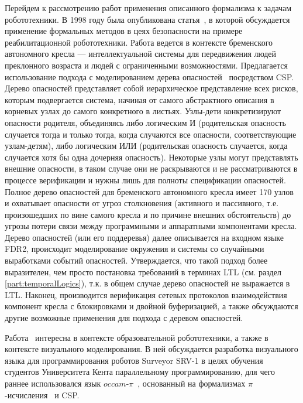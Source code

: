 \documentclass[conference]{IEEEtran}
\begin{document}
Перейдем к рассмотрению работ применения описанного формализма к задачам 
робототехники. В 1998 году была опубликована статья~\cite{lankenau1999formal}, 
в которой обсуждается применение формальных методов в цеях безопасности на 
примере реабилитационной робототехники. Работа ведется в контексте бременского 
автономного кресла --- интеллектуальной системы для передвижения людей преклонного 
возраста и людей с ограниченными возможностями. Предлагается использование 
подхода с моделированием дерева опасностей~\cite{vesely1981fault, hansen1996linking} 
посредством CSP. Дерево опасностей представляет собой иерархическое представление 
всех рисков, которым подвергается система, начиная от самого абстрактного описания 
в корневых узлах до самого конкретного в листьях. Узлы-дети конкретизируют опасности 
родителя, объединяясь либо логическим И (родительская опасность случается тогда 
и только тогда, когда случаются все опасности, соответствующие узлам-детям), 
либо логическим ИЛИ (родительская опасность случается, когда случается хотя бы 
одна дочерняя опасность). Некоторые узлы могут представлять внешние опасности, 
в таком случае они не раскрываются и не рассматриваются в процессе верификации 
и нужны лишь для полноты спецификации опасностей. Полное дерево опасностей для 
бременского автономного кресла имеет 170 узлов и охватывает опасности от угроз 
столкновения (активного и пассивного, т.е. произошедших по вине самого кресла 
и по причине внешних обстоятельств) до угрозы потери связи между программными 
и аппаратными компонентами кресла. Дерево опасностей (или его поддеревья) далее 
описывается на входном языке FDR2, происходит моделирование окружения и системы 
со случайными выработками событий опасностей. Утверждается, что такой подход 
более выразителен, чем просто постановка требований в терминах LTL (см. раздел 
\ref{part:temporalLogics}), т.к. в общем случае дерево опасностей не выражается 
в LTL. Наконец, производится верификация сетевых протоколов взаимодействия 
компонент кресла с блокировками и двойной буферизацией, а также обсуждаются 
другие возможные применения для подхода с деревом опасностей.

Работа~\cite{simpson2008visual} интересна в контексте образовательной 
робототехники, а также в контексте визуального моделирования. В ней обсуждается 
разработка визуального языка для программирования роботов Surveyor SRV-1
в целях обучения студентов Университета Кента параллельному программированию, 
для чего раннее использовался язык $occam\mbox{-}\pi$~\cite{welch2005communicating}, 
основанный на формализмах $\pi$-исчисления~\cite{welch2005communicating} и CSP.
\end{document}
